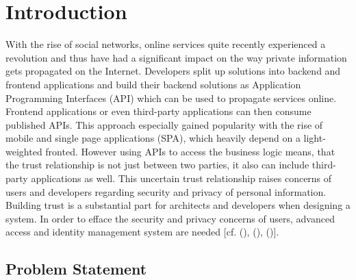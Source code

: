 \chapter{Introduction}\label{chap:introduction}
\chapterstart

With the rise of social networks, online services quite recently experienced a revolution and thus have had a significant impact on the way private information gets propagated on the Internet. Developers split up solutions into backend and frontend applications and build their backend solutions as Application Programming Interfaces (API) which can be used to propagate services online. Frontend applications or even third-party applications can then consume published APIs. This approach especially gained popularity with the rise of mobile and single page applications (SPA), which heavily depend on a light-weighted fronted. However using APIs to access the business logic means, that the trust relationship is not just between two parties, it also can include third-party applications as well. This uncertain trust relationship raises concerns of users and developers regarding security and privacy of personal information. Building trust is a substantial part for architects and developers when designing a system. In order to efface the security and privacy concerns of users, advanced access and identity management system are needed [cf. (\cite{Cirani:OBAS}), (\cite{Tkalec:2015}), (\cite{Rossvoll:2013:RUBIM})].


\section{Problem Statement}


